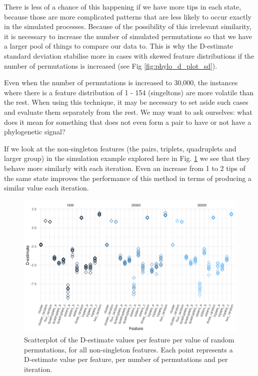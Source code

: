 \documentclass[12pt,letterpaper]{article}
\begin{document}
There is less of a chance of this happening if we have more tips in each state, because those are more complicated patterns that are less likely to occur exactly in the simulated processes. Because of the possibility of this irrelevant similarity, it is necessary to increase the number of simulated permutations so that we have a larger pool of things to compare our data to. This is why the D-estimate standard deviation stabilise more in cases with skewed feature distributions if the number of permutations is increased (see Fig \ref{fig:phylo_d_plot_sd}).


Even when the number of permutations is increased to 30,000, the instances where there is a feature distribution of 1 - 154 (singeltons) are more volatile than the rest. When using this technique, it may be necessary to set aside such cases and evaluate them separately from the rest. We may want to ask ourselves: what does it mean for something that does not even form a pair to have or not have a phylogenetic signal?

If we look at the non-singleton features (the pairs, triplets, quadruplets and larger group) in the simulation example explored here in Fig. \ref{fig:phylo_d_plot_non_singles} we see that they behave more similarly with each iteration. Even an increase from 1 to 2 tips of the same state improves the performance of this method in terms of producing a similar value each iteration.

\begin{figure}[ht]
\centering
\includegraphics[width=14cm]{illustrations/plots_from_R/phylo_d_permut_plot.png}
\caption{Scatterplot of the D-estimate values per feature per value of random permutations, for all non-singleton features. Each point represents a D-estimate value per feature, per number of permutations and per iteration.}
\label{fig:phylo_d_plot_non_singles}
\end{figure}
\end{document}
